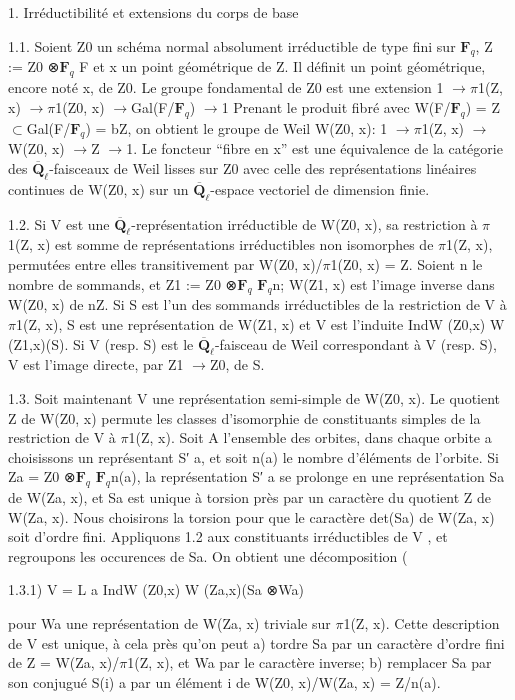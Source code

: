 \documentclass[11pt]{article}
\begin{document}
1. Irréductibilité et extensions du corps de base 

1.1. Soient Z0 un schéma normal absolument irréductible de type fini sur \(\mathbf F_q\), Z := Z0 ⊗\(\mathbf F_q\) F et x un point géométrique de Z. Il définit un point géométrique, encore noté x, de Z0. Le groupe fondamental de Z0 est une extension 1 \(\to\)\(\pi\)1(Z, x) \(\to\)\(\pi\)1(Z0, x) \(\to\)Gal(F/\(\mathbf F_q\)) \(\to\)1 Prenant le produit fibré avec W(F/\(\mathbf F_q\)) = Z \(\subset\)Gal(F/\(\mathbf F_q\)) = bZ, on obtient le groupe de Weil W(Z0, x): 1 \(\to\)\(\pi\)1(Z, x) \(\to\)W(Z0, x) \(\to\)Z \(\to\)1. Le foncteur “fibre en x” est une équivalence de la catégorie des \(\overline{\mathbf Q}_\ell\)-faisceaux de Weil lisses sur Z0 avec celle des représentations linéaires continues de W(Z0, x) sur un \(\overline{\mathbf Q}_\ell\)-espace vectoriel de dimension finie. 

1.2. Si V est une \(\overline{\mathbf Q}_\ell\)-représentation irréductible de W(Z0, x), sa restriction à \(\pi\)1(Z, x) est somme de représentations irréductibles non isomorphes de \(\pi\)1(Z, x), permutées entre elles transitivement par W(Z0, x)/\(\pi\)1(Z0, x) = Z. Soient n le nombre de sommands, et Z1 := Z0 ⊗\(\mathbf F_q\) \(\mathbf F_q\)n; W(Z1, x) est l’image inverse dans W(Z0, x) de nZ. Si S est l’un des sommands irréductibles de la restriction de V à \(\pi\)1(Z, x), S est une représentation de W(Z1, x) et V est l’induite IndW (Z0,x) W (Z1,x)(S). Si V (resp. S) est le \(\overline{\mathbf Q}_\ell\)-faisceau de Weil correspondant à V (resp. S), V est l’image directe, par Z1 \(\to\)Z0, de S. 

1.3. Soit maintenant V une représentation semi-simple de W(Z0, x). Le quotient Z de W(Z0, x) permute les classes d’isomorphie de constituants simples de la restriction de V à \(\pi\)1(Z, x). Soit A l’ensemble des orbites, dans chaque orbite a choisissons un représentant S′ a, et soit n(a) le nombre d’éléments de l’orbite. Si Za = Z0 ⊗\(\mathbf F_q\) \(\mathbf F_q\)n(a), la représentation S′ a se prolonge en une représentation Sa de W(Za, x), et Sa est unique à torsion près par un caractère du quotient Z de W(Za, x). Nous choisirons la torsion pour que le caractère det(Sa) de W(Za, x) soit d’ordre fini. Appliquons 1.2 aux constituants irréductibles de V , et regroupons les occurences de Sa. On obtient une décomposition (

1.3.1) V = L a IndW (Z0,x) W (Za,x)(Sa ⊗Wa)

pour Wa une représentation de W(Za, x) triviale sur \(\pi\)1(Z, x). Cette description de V est unique, à cela près qu’on peut a) tordre Sa par un caractère d’ordre fini de Z = W(Za, x)/\(\pi\)1(Z, x), et Wa par le caractère inverse; b) remplacer Sa par son conjugué S(i) a par un élément i de W(Z0, x)/W(Za, x) = Z/n(a). 
\end{document}
